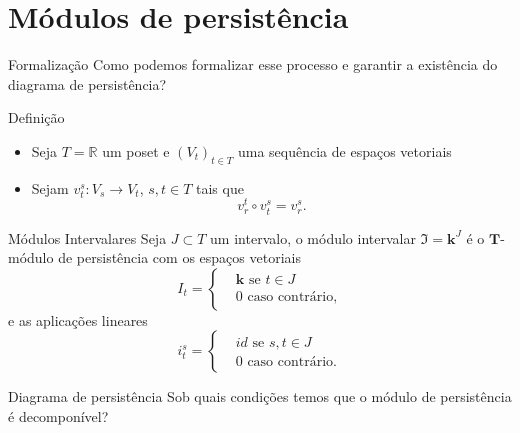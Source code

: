 \documentclass[10pt]{beamer}
\begin{document}
\section{Módulos de persistência}

\begin{frame}{Formalização}
    \centering
    {\Large Como podemos formalizar esse processo e garantir a existência
    do diagrama de persistência?}
\end{frame} 

\begin{frame}{Definição}
    \begin{itemize}
        \item Seja $T = \mathbb{R}$ um poset e $(V_t)_{t \in T}$ uma sequência de espaços vetoriais
        \item Sejam $v_t^s \colon V_s \to V_t$, $s,t \in T$ tais que 
                \begin{equation*}
                    v^t_r \circ v^s_t = v^s_r.
                \end{equation*}
    \end{itemize}
\end{frame}

\begin{frame}{Módulos Intervalares}
    Seja $J \subset T$ um intervalo, o módulo intervalar $\mathfrak{I} = \mathbf{k}^J$ 
    é o $\mathbf{T}$-módulo de persistência com os espaços vetoriais 
    \begin{equation*}
    I_t = \left\{
    \begin{split}
        & \mathbf{k} \text{ se } t \in J \\
        & 0 \text{ caso contrário,}
    \end{split}
    \right.
\end{equation*} 
e as aplicações lineares
\begin{equation*}
    i_t^s = \left\{
    \begin{split}
        & id \text{ se } s,t \in J \\
        & 0 \text{ caso contrário.}
    \end{split}
    \right.
\end{equation*}

\end{frame}

\begin{frame}{Diagrama de persistência}
    \centering
    {\Large Sob quais condições temos que o módulo de persistência é decomponível?} 
\end{frame}
\end{document}
